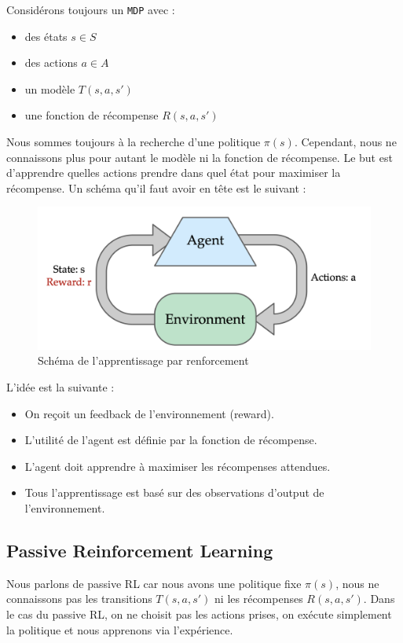 \noindent Considérons toujours un \texttt{MDP} avec :
\begin{itemize}[label=\textbullet]
    \item des états $s\in S$
    \item des actions $a\in A$
    \item un modèle $T(s,a,s')$
    \item une fonction de récompense $R(s,a,s')$
\end{itemize}
Nous sommes toujours à la recherche d'une politique $\pi(s)$. Cependant, nous ne connaissons plus pour autant le modèle ni la
fonction de récompense. Le but est d'apprendre quelles actions prendre dans quel état pour maximiser la récompense. Un schéma
qu'il faut avoir en tête est le suivant :
\begin{figure}[H]
    \centering
    \includegraphics[width=0.5\linewidth]{pictures/rl_scheme.png}
    \caption{Schéma de l'apprentissage par renforcement}
    \label{fig:rl_scheme}
\end{figure}
\noindent L'idée est la suivante :
\begin{itemize}[label=\textbullet]
    \item On reçoit un feedback de l'environnement (reward).
    \item L'utilité de l'agent est définie par la fonction de récompense.
    \item L'agent doit apprendre à maximiser les récompenses attendues.
    \item Tous l'apprentissage est basé sur des observations d'output de l'environnement.
\end{itemize}

\subsection{Passive Reinforcement Learning} %
Nous parlons de passive RL car nous avons une politique fixe $\pi(s)$, nous ne connaissons pas les transitions $T(s,a,s')$ ni
les récompenses $R(s,a,s')$. Dans le cas du passive RL, on ne choisit pas les actions prises, on exécute simplement la politique
et nous apprenons via l'expérience.
